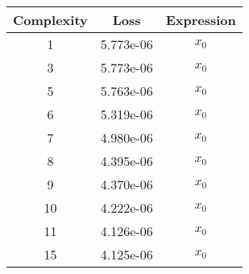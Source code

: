 \begin{center}
        \begin{tabular}{|c|c|c|}
        \hline
        Complexity & Loss & Expression \\
        \hline
        1 & 5.773e-06 & $\begin{aligned}x_{0}\end{aligned}$\\ \hline3 & 5.773e-06 & $\begin{aligned}x_{0}\end{aligned}$\\ \hline5 & 5.763e-06 & $\begin{aligned}x_{0}\end{aligned}$\\ \hline6 & 5.319e-06 & $\begin{aligned}x_{0}\end{aligned}$\\ \hline7 & 4.980e-06 & $\begin{aligned}x_{0}\end{aligned}$\\ \hline8 & 4.395e-06 & $\begin{aligned}x_{0}\end{aligned}$\\ \hline9 & 4.370e-06 & $\begin{aligned}x_{0}\end{aligned}$\\ \hline10 & 4.222e-06 & $\begin{aligned}x_{0}\end{aligned}$\\ \hline11 & 4.126e-06 & $\begin{aligned}x_{0}\end{aligned}$\\ \hline15 & 4.125e-06 & $\begin{aligned}x_{0}\end{aligned}$\\ \hline\end{tabular}
        \end{center}
        